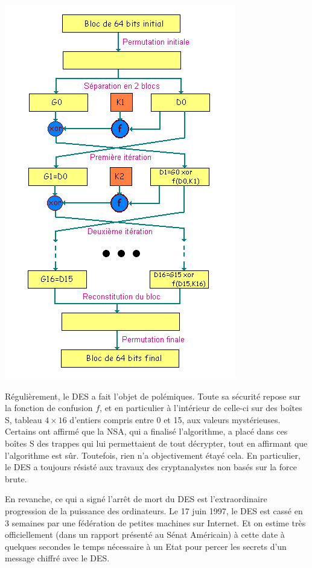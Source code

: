 \documentclass[a4paper,12pt]{article}
\begin{document}
\begin{center}
  \includegraphics[scale=0.5]{../Image/des.png}
\end{center}


Régulièrement, le DES a fait l'objet de polémiques. Toute sa sécurité repose sur la fonction de confusion $f$, et en particulier à l'intérieur de celle-ci sur des boîtes S, tableau $4 \times 16$ d'entiers compris entre 0 et 15, aux valeurs mystérieuses. Certains ont affirmé que la NSA, qui a finalisé l'algorithme, a placé dans ces boîtes S des trappes qui lui permettaient de tout décrypter, tout en affirmant que l'algorithme est sûr. Toutefois, rien n'a objectivement étayé cela. En particulier, le DES a toujours résisté aux travaux des cryptanalystes non basés sur la force brute.

En revanche, ce qui a signé l'arrêt de mort du DES est l'extraordinaire progression de la puissance des ordinateurs. Le 17 juin 1997, le DES est cassé en 3 semaines par une fédération de petites machines sur Internet. Et on estime très officiellement (dans un rapport présenté au Sénat Américain) à cette date à quelques secondes le temps nécessaire à un Etat pour percer les secrets d'un message chiffré avec le DES.
\end{document}
